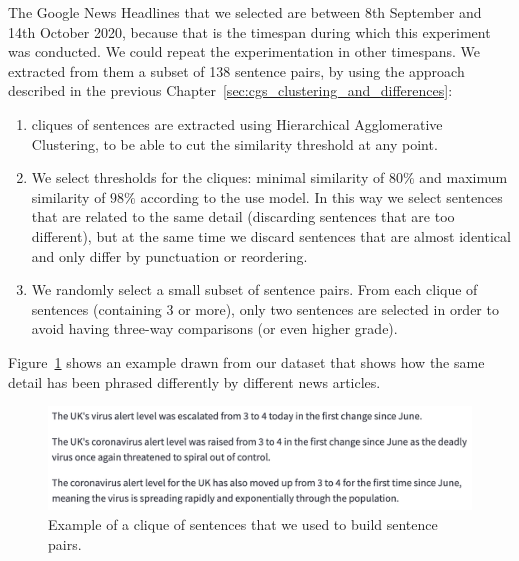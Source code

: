 The Google News Headlines that we selected are between 8th September and 14th October 2020, because that is the timespan during which this experiment was conducted. We could repeat the experimentation in other timespans.
We extracted from them a subset of 138 sentence pairs, by using the approach described in the previous Chapter~\ref{sec:cgs_clustering_and_differences}:
\begin{enumerate}
    \item cliques of sentences are extracted using Hierarchical Agglomerative Clustering, to be able to cut the similarity threshold at any point.
    \item We select thresholds for the cliques: minimal similarity of $80\%$ and maximum similarity of $98\%$ according to the \acrshort{use} model. In this way we select sentences that are related to the same detail (discarding sentences that are too different), but at the same time we discard sentences that are almost identical and only differ by punctuation or reordering.
    \item We randomly select a small subset of sentence pairs. From each clique of sentences (containing 3 or more), only two sentences are selected in order to avoid having three-way comparisons (or even higher grade).
\end{enumerate}

Figure~\ref{fig:raw_clique_data} shows an example drawn from our dataset that shows how the same detail has been phrased differently by different news articles.

\begin{figure}[!htbp]
    \centering
    \includegraphics[width=\linewidth]{figures/annotation_212_raw_cluster.png}
    \caption{Example of a clique of sentences that we used to build sentence pairs.}
    \label{fig:raw_clique_data}
\end{figure}


